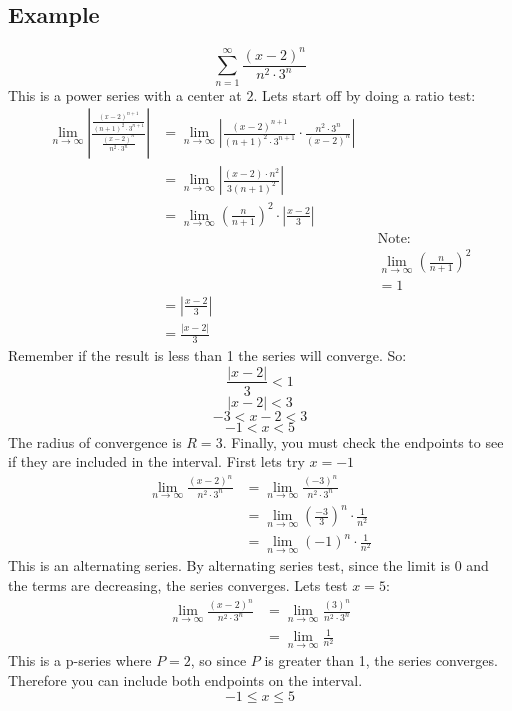 \documentclass{article}
\begin{document}
    \subsection{Example}
        \[\sum_{n = 1}^{\infty} \frac{(x-2)^n}{n^2 \cdot 3^n} \]
        This is a power series with a center at \(2\).
        Lets start off by doing a ratio test:
        \begin{align*}
            \lim_{n \to \infty} \left| \frac{\frac{(x-2)^{n+1}}{(n+1)^2 \cdot 3^{n+1}}}{\frac{(x-2)^n}{n^2 \cdot 3^n}} \right|
            &= \lim_{n \to \infty} \left| \frac{(x-2)^{n+1}}{(n+1)^2 \cdot 3^{n+1}} \cdot \frac{n^2 \cdot 3^n}{(x-2)^n} \right| \\
            &= \lim_{n \to \infty} \left| \frac{(x-2) \cdot n^2}{3(n+1)^2} \right| \\
            &= \lim_{n \to \infty} \left( \frac{n}{n+1}\right)^2 \cdot \left| \frac{x-2}{3} \right| \\
            && &\text{Note:} \\
            && & \lim_{n \to \infty} \left( \frac{n}{n+1} \right)^2 \\
            && &=1 \\
            &= \left| \frac{x-2}{3}\right| \\
            &= \frac{|x-2|}{3}
        \end{align*}
        Remember if the result is less than 1 the series will converge.
        So:
        \[\frac{|x-2|}{3} < 1\]
        \[|x-2| < 3\]
        \[-3 < x-2 < 3\]
        \[-1 < x < 5\]
        The radius of convergence is \(R = 3\).
        Finally, you must check the endpoints to see if they are included in the interval.
        First lets try \(x = -1\)
        \begin{align*}
            \lim_{n \to \infty} \frac{(x-2)^n}{n^2 \cdot 3^n}
            &= \lim_{n \to \infty}  \frac{(-3)^n}{n^2 \cdot 3^n} \\
            &= \lim_{n \to \infty} \left(\frac{-3}{3}\right)^n \cdot \frac{1}{n^2} \\
            &=\lim_{n \to \infty} (-1)^n \cdot \frac{1}{n^2}
        \end{align*}
        This is an alternating series.
        By alternating series test, since the limit is 0 and the terms are decreasing, the series converges.
        Lets test \(x = 5\):
        \begin{align*}
            \lim_{n \to \infty} \frac{(x-2)^n}{n^2 \cdot 3^n}
            &= \lim_{n \to \infty}  \frac{(3)^n}{n^2 \cdot 3^n} \\
            &= \lim_{n \to \infty} \frac{1}{n^2}
        \end{align*}
        This is a p-series where \(P = 2\), so since \(P\) is greater than 1, the series converges.
        Therefore you can include both endpoints on the interval.
        \[-1 \leq x \leq 5\]
    
\end{document}
